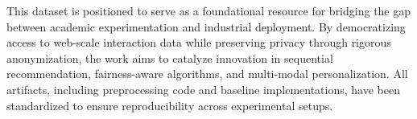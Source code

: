 \documentclass[sigconf,authorversion,nonacm]{acmart}
\begin{document}
This dataset is positioned to serve as a foundational resource for bridging the gap between academic experimentation and industrial deployment. By democratizing access to web-scale interaction data while preserving privacy through rigorous anonymization, the work aims to catalyze innovation in sequential recommendation, fairness-aware algorithms, and multi-modal personalization. All artifacts, including preprocessing code and baseline implementations, have been standardized to ensure reproducibility across experimental setups.



\end{document}
